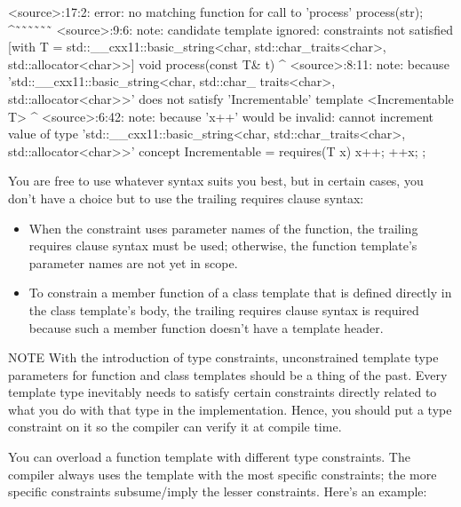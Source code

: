 \begin{shell}
<source>:17:2: error: no matching function for call to 'process'
        process(str);
        ^˜˜˜˜˜˜
<source>:9:6: note: candidate template ignored: constraints not satisfied [with T =
std::__cxx11::basic_string<char, std::char_traits<char>, std::allocator<char>>]
void process(const T& t)
     ^
<source>:8:11: note: because 'std::__cxx11::basic_string<char, std::char_
traits<char>, std::allocator<char>>' does not satisfy 'Incrementable'
template <Incrementable T>
          ^
<source>:6:42: note: because 'x++' would be invalid: cannot increment value of type
'std::__cxx11::basic_string<char, std::char_traits<char>, std::allocator<char>>'
concept Incrementable = requires(T x) { x++; ++x; };
\end{shell}

You are free to use whatever syntax suits you best, but in certain cases, you don’t have a choice but to use the trailing requires clause syntax:

\begin{itemize}
\item
When the constraint uses parameter names of the function, the trailing requires clause syntax must be used; otherwise, the function template’s parameter names are not yet in scope.

\item
To constrain a member function of a class template that is defined directly in the class template’s body, the trailing requires clause syntax is required because such a member function doesn’t have a template header.
\end{itemize}

\begin{myNotic}{NOTE}
With the introduction of type constraints, unconstrained template type parameters for function and class templates should be a thing of the past. Every template type inevitably needs to satisfy certain constraints directly related to what you do with that type in the implementation. Hence, you should put a type constraint on it so the compiler can verify it at compile time.
\end{myNotic}


You can overload a function template with different type constraints. The compiler always uses the template with the most specific constraints; the more specific constraints subsume/imply the lesser constraints. Here’s an example:

